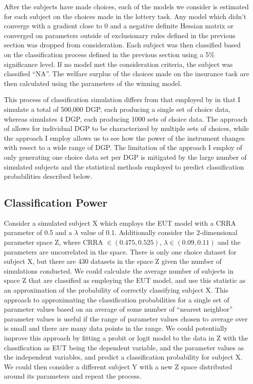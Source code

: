 \documentclass[../main.tex]{subfiles}
\begin{document}
After the subjects have made choices, each of the models we consider is estimated for each subject on the choices made in the lottery task.
Any model which didn't converge with a gradient close to 0 and a negative definite Hessian matrix or converged on parameters outside of exclusionary rules defined in the previous section was dropped from consideration.
Each subject was then classified based on the classification process defined in the previous section using a 5\% significance level.
If no model met the consideration criteria, the subject was classified \enquote{NA}.
The welfare surplus of the choices made on the insurance task are then calculated using the parameters of the winning model.

This process of classification simulation differs from that employed by \textcite{Wilcox2015} in that I simulate a total of 500,000 DGP, each producing a single set of choice data, whereas \textcite{Wilcox2015} simulates 4 DGP, each producing 1000 sets of choice data.
The approach of \textcite{Wilcox2015} allows for individual DGP to be characterized by multiple sets of choices, while the approach I employ allows us to see how the power of the instrument changes with resect to a wide range of DGP.
The limitation of the approach I employ of only generating one choice data set per DGP is mitigated by the large number of simulated subjects and the statistical methods employed to predict classification probabilities described below.

\singlespacing
\subsection{\texorpdfstring{\textcite{Harrison2016}}{Harrison and Ng (2016)} Classification Power}
\doublespacing

Consider a simulated subject X which employs the EUT model with a CRRA parameter of 0.5 and a $\lambda$ value of 0.1.
Additionally consider the 2-dimensional parameter space Z, where CRRA $\in (0.475,0.525)$, $\lambda \in (0.09, 0.11)$ and the parameters are uncorrelated in the space.
There is only one choice dataset for subject X, but there are 430 datasets in the space Z given the number of simulations conducted.
We could calculate the average number of subjects in space Z that are classified as employing the EUT model, and use this statistic as an approximation of the probability of correctly classifying subject X.
This approach to approximating the classification probabilities for a single set of parameter values based on an average of some number of \enquote{nearest neighbor} parameter values is useful if the range of parameter values chosen to average over is small and there are many data points in the range.
We could potentially improve this approach by fitting a probit or logit model to the data in Z with the classification as EUT being the dependent variable, and the parameter values as the independent variables, and predict a classification probability for subject X.
We could then consider a different subject Y with a new Z space distributed around its parameters and repeat the process.
\end{document}
